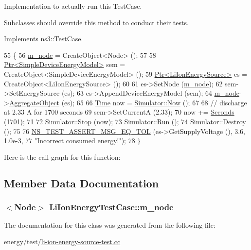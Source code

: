 Implementation to actually run this Test\+Case. 

Subclasses should override this method to conduct their tests. 

Implements \hyperlink{classns3_1_1TestCase_a8ff74680cf017ed42011e4be51917a24}{ns3\+::\+Test\+Case}.


\begin{DoxyCode}
55 \{
56   \hyperlink{classLiIonEnergyTestCase_a9d2461f197dba973b9b93cb3e82f34ae}{m\_node} = CreateObject<Node> ();
57 
58   \hyperlink{classns3_1_1Ptr}{Ptr<SimpleDeviceEnergyModel>} sem = CreateObject<SimpleDeviceEnergyModel> ();
59   \hyperlink{classns3_1_1Ptr}{Ptr<LiIonEnergySource>} es = CreateObject<LiIonEnergySource> ();
60 
61   es->SetNode (\hyperlink{classLiIonEnergyTestCase_a9d2461f197dba973b9b93cb3e82f34ae}{m\_node});
62   sem->SetEnergySource (es);
63   es->AppendDeviceEnergyModel (sem);
64   \hyperlink{classLiIonEnergyTestCase_a9d2461f197dba973b9b93cb3e82f34ae}{m\_node}->\hyperlink{classns3_1_1Object_a79dd435d300f3deca814553f561a2922}{AggregateObject} (es);
65 
66   \hyperlink{classns3_1_1Time}{Time} now = \hyperlink{group__simulator_gac3635e2e87f7ce316c89290ee1b01d0d}{Simulator::Now} ();
67 
68   \textcolor{comment}{// discharge at 2.33 A for 1700 seconds}
69   sem->SetCurrentA (2.33);
70   now += \hyperlink{group__timecivil_ga33c34b816f8ff6628e33d5c8e9713b9e}{Seconds} (1701);
71 
72   Simulator::Stop (now);
73   Simulator::Run ();
74   Simulator::Destroy ();
75 
76   \hyperlink{group__testing_ga9e7861b56b4e70db3b56044cb7a28e41}{NS\_TEST\_ASSERT\_MSG\_EQ\_TOL} (es->GetSupplyVoltage (), 3.6, 1.0e-3,
77                              \textcolor{stringliteral}{"Incorrect consumed energy!"});
78 \}
\end{DoxyCode}


Here is the call graph for this function\+:




\subsection{Member Data Documentation}
\subsubsection[{\texorpdfstring{m\+\_\+node}{m_node}}]{$<${\bf Node}$>$ Li\+Ion\+Energy\+Test\+Case\+::m\+\_\+node}\hypertarget{classLiIonEnergyTestCase_a9d2461f197dba973b9b93cb3e82f34ae}{}\label{classLiIonEnergyTestCase_a9d2461f197dba973b9b93cb3e82f34ae}


The documentation for this class was generated from the following file\+:\begin{DoxyCompactItemize}
\item 
energy/test/\hyperlink{li-ion-energy-source-test_8cc}{li-\/ion-\/energy-\/source-\/test.\+cc}\end{DoxyCompactItemize}
